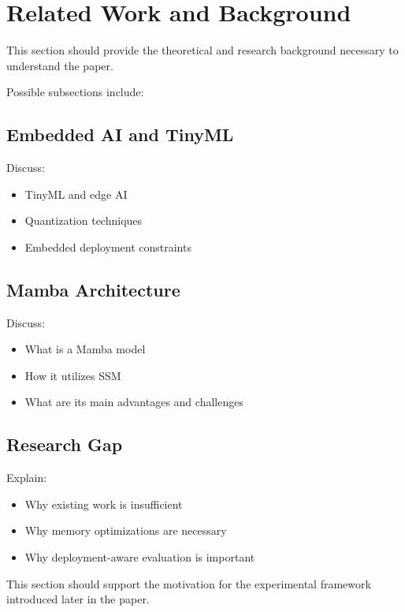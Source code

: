 \section{Related Work and Background}

This section should provide the theoretical and research background necessary to understand the paper.

Possible subsections include:

\subsection{Embedded AI and TinyML}

Discuss:
\begin{itemize}
  \item TinyML and edge AI
  \item Quantization techniques
  \item Embedded deployment constraints
\end{itemize}
\subsection{Mamba Architecture}

Discuss:
\begin{itemize}
  \item What is a Mamba model
  \item How it utilizes SSM
  \item What are its main advantages and challenges
\end{itemize}

\subsection{Research Gap}

Explain:
\begin{itemize}
  \item Why existing work is insufficient
  \item Why memory optimizations are necessary
  \item Why deployment-aware evaluation is important
\end{itemize}

This section should support the motivation for the experimental framework introduced later in the paper.

